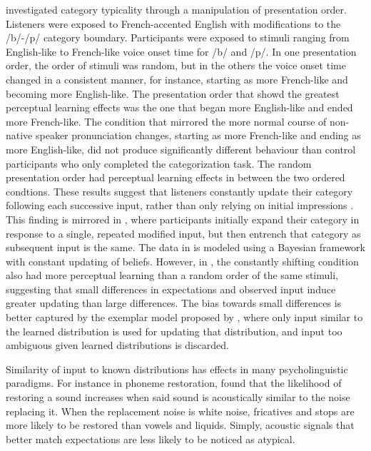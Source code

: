 \citet{Sumner2011} investigated category typicality through a manipulation of presentation order. 
Listeners were exposed to French-accented English with modifications to the /b/-/p/ category boundary.
Participants were exposed to stimuli ranging from English-like to French-like voice onset time for /b/ and /p/.
In one presentation order, the order of stimuli was random, but in the others the voice onset time changed in a consistent manner, for instance, starting as more French-like and becoming more English-like.
The presentation order that showd the greatest perceptual learning effects was the one that began more English-like and ended more French-like.
The condition that mirrored the more normal course of non-native speaker pronunciation changes, starting as more French-like and ending as more English-like, did not produce significantly different behaviour than control participants who only completed the categorization task.
The random presentation order had perceptual learning effects in between the two ordered condtions.
These results suggest that listeners constantly update their category following each successive input, rather than only relying on initial impressions \citep[contra][]{Kraljic2008}.
This finding is mirrored in \citet{Vroomen2007}, where participants initially expand their category in response to a single, repeated modified input, but then entrench that category as subsequent input is the same.
The data in \citet{Vroomen2007} is modeled using a Bayesian framework with constant updating of beliefs.
However, in \citet{Sumner2011}, the constantly shifting condition also had more perceptual learning than a random order of the same stimuli, suggesting that small differences in expectations and observed input induce greater updating than large differences.
The bias towards small differences is better captured by the exemplar model proposed by \citet{Pierrehumbert2001}, where only input similar to the learned distribution is used for updating that distribution, and input too ambiguous given learned distributions is discarded.

Similarity of input to known distributions has effects in many psycholinguistic paradigms.
For instance in phoneme restoration, \citet{Samuel1981} found that the likelihood of restoring a sound increases when said sound is acoustically similar to the noise replacing it.  
When the replacement noise is white noise, fricatives and stops are more likely to be restored than vowels and liquids.
Simply, acoustic signals that better match expectations are less likely to be noticed as atypical.

